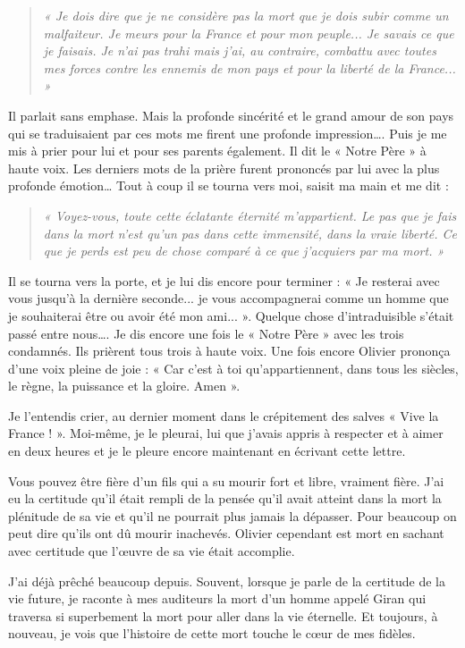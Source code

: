 \begin{quote}\itshape
« Je dois dire que je ne considère pas la mort que je dois subir comme un malfaiteur. Je meurs pour la
France et pour mon peuple... Je savais ce que je faisais. Je n’ai pas trahi mais j’ai, au contraire, combattu
avec toutes mes forces contre les ennemis de mon pays et pour la liberté de la France... »
\end{quote}

Il parlait sans emphase. Mais la profonde sincérité et le grand amour de son pays qui se
traduisaient par ces mots me firent une profonde impression…. Puis je me mis à prier pour lui et
pour ses parents également. Il dit le « Notre Père » à haute voix. Les derniers mots de la prière
furent prononcés par lui avec la plus profonde émotion… Tout à coup il se tourna vers moi, saisit
ma main et me dit :

\begin{quote}\itshape
« Voyez-vous, toute cette éclatante éternité m’appartient. Le pas que je fais dans la mort n’est qu’un pas
dans cette immensité, dans la vraie liberté. Ce que je perds est peu de chose comparé à ce que j’acquiers
par ma mort. »
\end{quote}


Il se tourna vers la porte, et je lui dis encore pour terminer : « Je resterai avec vous jusqu’à la
dernière seconde... je vous accompagnerai comme un homme que je souhaiterai être ou avoir été
mon ami... ». Quelque chose d’intraduisible s’était passé entre nous….
Je dis encore une fois le « Notre Père » avec les trois condamnés. Ils prièrent tous trois à haute
voix. Une fois encore Olivier prononça d’une voix pleine de joie : « Car c’est à toi
qu’appartiennent, dans tous les siècles, le règne, la puissance et la gloire. Amen ».

Je l’entendis crier, au dernier moment dans le crépitement des salves « Vive la France ! ».
Moi-même, je le pleurai, lui que j’avais appris à respecter et à aimer en deux heures et je le pleure
encore maintenant en écrivant cette lettre.

Vous pouvez être fière d’un fils qui a su mourir fort et libre, vraiment fière. J’ai eu la certitude
qu’il était rempli de la pensée qu’il avait atteint dans la mort la plénitude de sa vie et qu’il ne
pourrait plus jamais la dépasser. Pour beaucoup on peut dire qu’ils ont dû mourir inachevés.
Olivier cependant est mort en sachant avec certitude que l’œuvre de sa vie était accomplie.

J’ai déjà prêché beaucoup depuis. Souvent, lorsque je parle de la certitude de la vie future, je
raconte à mes auditeurs la mort d’un homme appelé Giran qui traversa si superbement la mort
pour aller dans la vie éternelle. Et toujours, à nouveau, je vois que l’histoire de cette mort touche
le cœur de mes fidèles.

